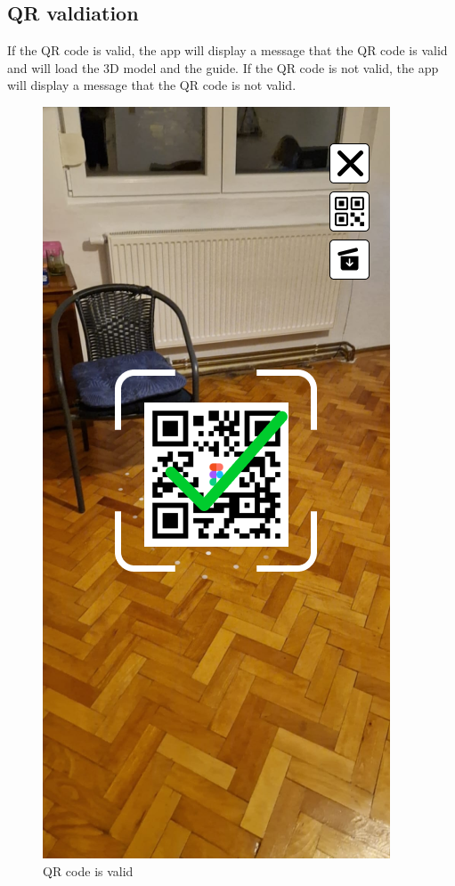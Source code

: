 \subsection{QR valdiation}
If the QR code is valid, the app will display a message that the QR code is valid and will load the 3D model and the guide. If the QR code is not valid, the app will display a message that the QR code is not valid.

\begin{figure}[h!]
    \begin{center}
        \includegraphics[scale=0.5]{img/App_mock/iPhone 14 - 4.png}
        \caption{QR code is valid}
        \label{fig:qr-valdiation}
    \end{center}
\end{figure}
\pagebreak

